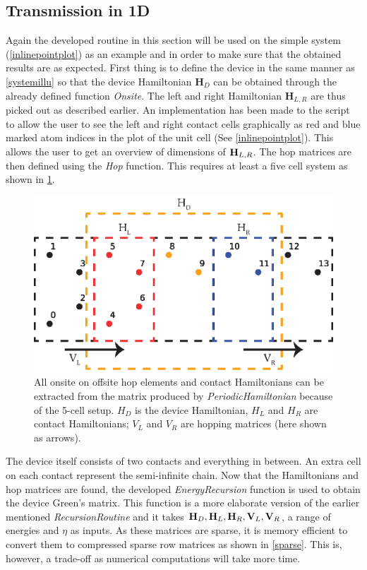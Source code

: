 \subsection{Transmission in 1D}
Again the developed routine in this section will be used on the simple system (\cref{inlinepointplot}) as an example and in order to make sure that the obtained results are as expected. First thing is to define the device in the same manner as \cref{systemillu} so that the device Hamiltonian \(\textbf{H}_D\) can be obtained through the already defined function \textit{Onsite}. The left and right Hamiltonian \(\textbf{H}_{L,R}\) are thus picked out as described earlier. An implementation has been made to the script to allow the user to see the left and right contact cells graphically as red and blue marked atom indices in the plot of the unit cell (See \cref{inlinepointplot}).
This allows the user to get an overview of dimensions of \(\vb{H}_{L,R}\). The hop matrices are then defined using the \textit{Hop} function. This requires at least a five cell system as shown in \cref{2DHammil}.
\begin{figure}[ht]
	\centering
	\includegraphics[width=.7\textwidth]{Figures/2DHam.eps}
	\caption{All onsite on offsite hop elements and contact Hamiltonians can be extracted from the matrix produced by \textit{PeriodicHamiltonian} because of the 5-cell setup. \(H_D\) is the device Hamiltonian, \(H_L\) and \(H_R\) are contact Hamiltonians; \(V_L\) and \(V_R\) are hopping matrices (here shown as arrows).}
	\label{2DHammil}
\end{figure}
The device itself consists of two contacts and everything in between. An extra cell on each contact represent the semi-infinite chain.\newline
Now that the Hamiltonians and hop matrices are found, the developed \textit{EnergyRecursion} function is used to obtain the device Green's matrix. This function is a more elaborate version of the earlier mentioned \textit{RecursionRoutine} and it takes \(\vb{H}_D,\vb{H}_L,\vb{H}_R,\vb{V}_L,\vb{V}_R\), a range of energies and \(\eta\) as inputs. As these matrices are sparse, it is memory efficient to convert them to compressed sparse row matrices as shown in \cref{sparse}. This is, however, a trade-off as numerical computations will take more time.
